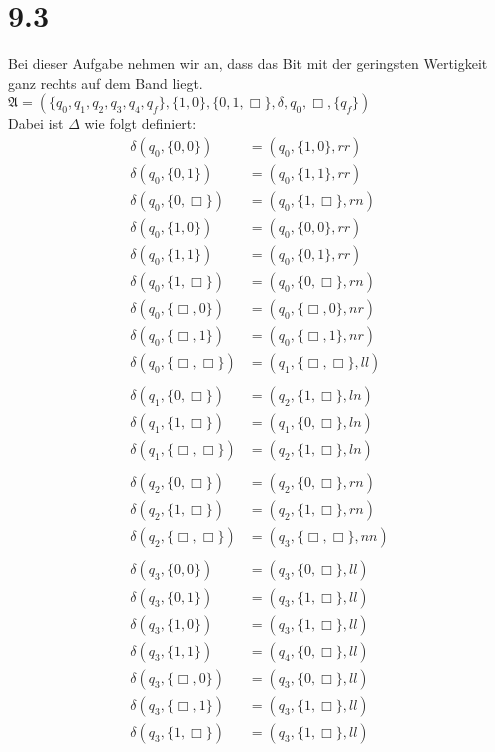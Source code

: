 \documentclass[12pt, a4paper]{article}
\begin{document}
\section*{9.3}
Bei dieser Aufgabe nehmen wir an, dass das Bit mit der geringsten Wertigkeit ganz rechts auf dem Band liegt.
$\mathfrak{A} = (\{q_0,q_1, q_2, q_3, q_4, q_f\}, \{1,0\},\{0,1, \Box \}, \delta, q_0, \Box, \{q_f\})$\\
Dabei ist $\Delta$ wie folgt definiert:\\
\begin{align*}
\delta(q_0,\{0,0\}) &= (q_0,\{1,0\},rr)\\
\delta(q_0,\{0,1\}) &= (q_0,\{1,1\},rr)\\
\delta(q_0,\{0,\Box\}) &= (q_0,\{1,\Box\},rn)\\
\delta(q_0,\{1,0\}) &= (q_0,\{0,0\},rr)\\
\delta(q_0,\{1,1\}) &= (q_0,\{0,1\},rr)\\
\delta(q_0,\{1,\Box\}) &= (q_0,\{0,\Box\},rn)\\
\delta(q_0,\{\Box,0\}) &= (q_0,\{\Box,0\},nr)\\
\delta(q_0,\{\Box,1\}) &= (q_0,\{\Box,1\},nr)\\
\delta(q_0,\{\Box,\Box\}) &= (q_1,\{\Box,\Box\},ll)\\
\\
\delta(q_1,\{0, \Box\}) &= (q_2, \{1,\Box\}, ln)\\
\delta(q_1,\{1, \Box\}) &= (q_1, \{0,\Box\}, ln)\\
\delta(q_1,\{\Box, \Box\}) &= (q_2, \{1,\Box\}, ln)\\
\\
\delta(q_2,\{0, \Box\}) &= (q_2, \{0, \Box\}, rn)\\
\delta(q_2, \{1, \Box\}) &= (q_2, \{1, \Box\}, rn)\\
\delta(q_2, \{\Box, \Box\}) &= (q_3, \{\Box, \Box\}, nn)\\
\\
\delta(q_3, \{0,0\}) &=(q_3, \{0,\Box\},ll)\\
\delta(q_3, \{0,1\}) &=(q_3, \{1,\Box\},ll)\\
\delta(q_3, \{1,0\}) &=(q_3, \{1,\Box\},ll)\\
\delta(q_3, \{1,1\}) &=(q_4, \{0,\Box\},ll)\\
\delta(q_3, \{\Box,0\}) &=(q_3, \{0,\Box\},ll)\\
\delta(q_3, \{\Box,1\}) &=(q_3, \{1,\Box\},ll)\\
\delta(q_3, \{1,\Box\}) &=(q_3, \{1,\Box\},ll)\\

\end{align*}
\end{document}
